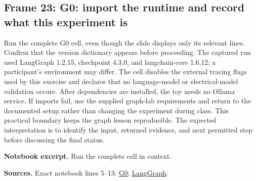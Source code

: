 \documentclass[11pt]{article}
\begin{document}
\subsection*{Frame 23: G0: import the runtime and record what this experiment is}
Run the complete G0 cell, even though the slide displays only its relevant lines. Confirm that the version dictionary appears before proceeding. The captured run used LangGraph 1.2.15, checkpoint 4.3.0, and langchain-core 1.6.12; a participant's environment may differ. The cell disables the external tracing flags used by this exercise and declares that no language-model or electrical-model validation occurs. After dependencies are installed, the toy needs no Ollama service. If imports fail, use the supplied graph-lab requirements and return to the documented setup rather than changing the experiment during class. This practical boundary keeps the graph lesson reproducible. The expected interpretation is to identify the input, returned evidence, and next permitted step before discussing the final status.\par
\par\noindent\begin{minipage}{\linewidth}\textbf{Notebook excerpt.} Run the complete cell in context.\par \end{minipage}\par
\par\nopagebreak\begin{minipage}{\linewidth}{\footnotesize\color{slate}\textbf{Sources.} Exact notebook lines 5--13: \href{../Graph_Workflow_Lab.ipynb}{G0}; \href{https://docs.langchain.com/oss/python/langgraph/overview}{LangGraph}.\par}\end{minipage}\par\medskip
\end{document}
